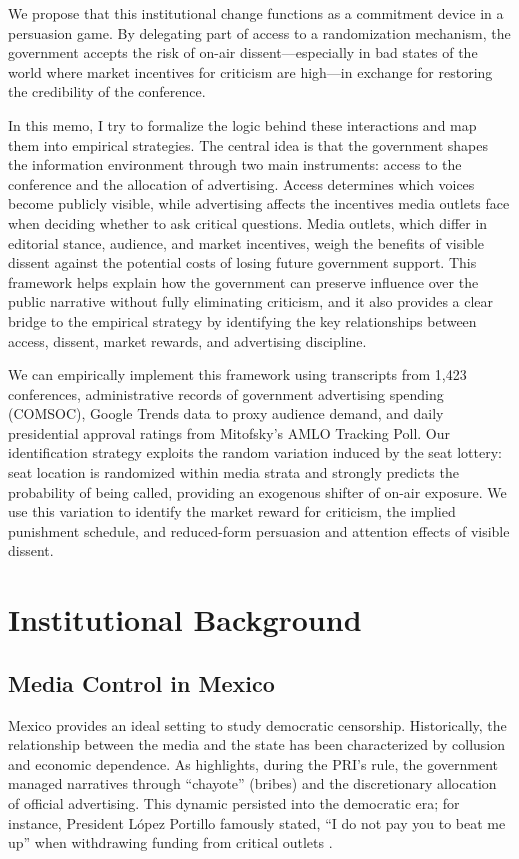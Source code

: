 \documentclass[12pt]{article}
\begin{document}
We propose that this institutional change functions as a commitment device in a persuasion game. By delegating part of access to a randomization mechanism, the government accepts the risk of on-air dissent---especially in bad states of the world where market incentives for criticism are high---in exchange for restoring the credibility of the conference.

In this memo, I try to formalize the logic behind these interactions and map them into empirical strategies. The central idea is that the government shapes the information environment through two main instruments: access to the conference and the allocation of advertising. Access determines which voices become publicly visible, while advertising affects the incentives media outlets face when deciding whether to ask critical questions. Media outlets, which differ in editorial stance, audience, and market incentives, weigh the benefits of visible dissent against the potential costs of losing future government support. This framework helps explain how the government can preserve influence over the public narrative without fully eliminating criticism, and it also provides a clear bridge to the empirical strategy by identifying the key relationships between access, dissent, market rewards, and advertising discipline.

We can empirically implement this framework using transcripts from 1,423 conferences, administrative records of government advertising spending (COMSOC), Google Trends data to proxy audience demand, and daily presidential approval ratings from Mitofsky's AMLO Tracking Poll. Our identification strategy exploits the random variation induced by the seat lottery: seat location is randomized within media strata and strongly predicts the probability of being called, providing an exogenous shifter of on-air exposure. We use this variation to identify the market reward for criticism, the implied punishment schedule, and reduced-form persuasion and attention effects of visible dissent.

\section{Institutional Background}

\subsection{Media Control in Mexico}
Mexico provides an ideal setting to study democratic censorship. Historically, the relationship between the media and the state has been characterized by collusion and economic dependence. As \cite{FourthState-Lawson-Book} highlights, during the PRI's rule, the government managed narratives through ``chayote'' (bribes) and the discretionary allocation of official advertising. This dynamic persisted into the democratic era; for instance, President López Portillo famously stated, ``I do not pay you to beat me up'' when withdrawing funding from critical outlets \citep{PrensaVendida-Rod}.
\end{document}
